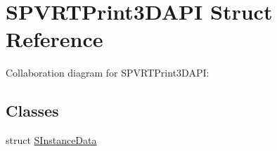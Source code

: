 \hypertarget{struct_s_p_v_r_t_print3_d_a_p_i}{\section{S\+P\+V\+R\+T\+Print3\+D\+A\+P\+I Struct Reference}
\label{struct_s_p_v_r_t_print3_d_a_p_i}
}


Collaboration diagram for S\+P\+V\+R\+T\+Print3\+D\+A\+P\+I\+:
\subsection*{Classes}
\begin{DoxyCompactItemize}
\item 
struct \hyperlink{struct_s_p_v_r_t_print3_d_a_p_i_1_1_s_instance_data}{S\+Instance\+Data}
\end{DoxyCompactItemize}
